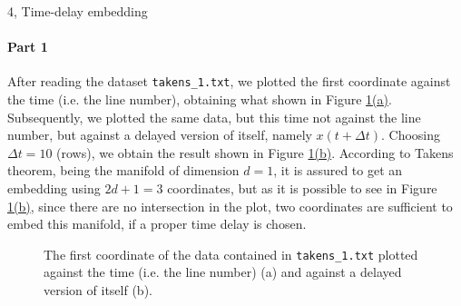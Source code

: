 \documentclass[10pt,a4paper]{article}
\begin{document}
\begin{task}{4, Time-delay embedding}
\paragraph{Part 1}
After reading the dataset \texttt{takens\_1.txt}, we plotted the first coordinate against the time (i.e. the line number), obtaining what shown in Figure \hyperref[fig:takens1-coord-1]{\ref{fig:takens1-coord-1}(a)}.
Subsequently, we plotted the same data, but this time not against the line number, but against a delayed version of itself, namely $x(t + \Delta t)$.
Choosing $\Delta t = 10$ (rows), we obtain the result shown in Figure \hyperref[fig:takens1-coord-1]{\ref{fig:takens1-coord-1}(b)}.
According to Takens theorem, being the manifold of dimension $d=1$, it is assured to get an embedding using $2d+1=3$ coordinates, but as it is possible to see in Figure \hyperref[fig:takens1-coord-1]{\ref{fig:takens1-coord-1}(b)}, since there are no intersection in the plot, two coordinates are sufficient to embed this manifold, if a proper time delay is chosen.

\begin{figure}[H]
    \centering
    \hfill
    \caption{The first coordinate of the data contained in \texttt{takens\_1.txt} plotted against the time (i.e. the line number) (a) and against a delayed version of itself (b).}
    \label{fig:takens1-coord-1}
\end{figure}


\end{task}
\end{document}
